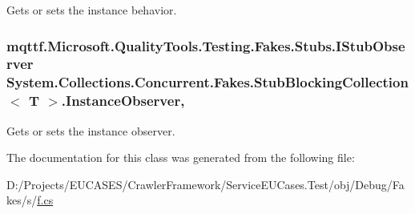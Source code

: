 Gets or sets the instance behavior.

\hypertarget{class_system_1_1_collections_1_1_concurrent_1_1_fakes_1_1_stub_blocking_collection_3_01_t_01_4_aa5f131d2dbd7330d2b1b549d81ec30e4}{
\subsubsection[{Instance\-Observer}]{\setlength{\rightskip}{0pt plus 5cm}mqttf.\-Microsoft.\-Quality\-Tools.\-Testing.\-Fakes.\-Stubs.\-I\-Stub\-Observer System.\-Collections.\-Concurrent.\-Fakes.\-Stub\-Blocking\-Collection$<$ T $>$.Instance\-Observer\hspace{0.3cm}{\ttfamily [get]}, {\ttfamily [set]}}}\label{class_system_1_1_collections_1_1_concurrent_1_1_fakes_1_1_stub_blocking_collection_3_01_t_01_4_aa5f131d2dbd7330d2b1b549d81ec30e4}


Gets or sets the instance observer.



The documentation for this class was generated from the following file\-:\begin{DoxyCompactItemize}
\item 
D\-:/\-Projects/\-E\-U\-C\-A\-S\-E\-S/\-Crawler\-Framework/\-Service\-E\-U\-Cases.\-Test/obj/\-Debug/\-Fakes/s/\hyperlink{s_2f_8cs}{f.\-cs}\end{DoxyCompactItemize}

